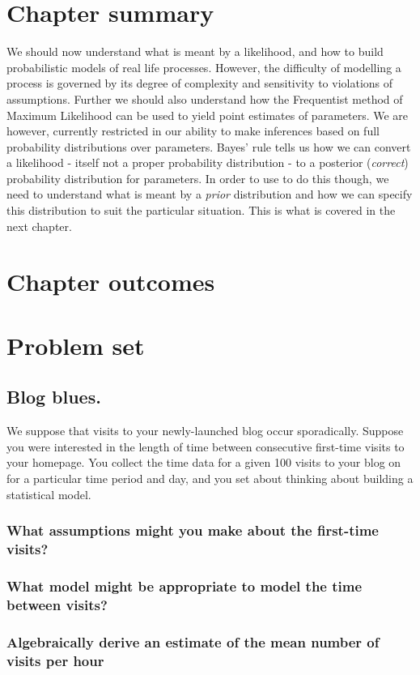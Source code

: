\documentclass[11pt,fullpage]{book}
\begin{document}
\section{Chapter summary}
We should now understand what is meant by a likelihood, and how to build probabilistic models of real life processes. However, the difficulty of modelling a process is governed by its degree of complexity and sensitivity to violations of assumptions. Further we should also understand how the Frequentist method of Maximum Likelihood can be used to yield point estimates of parameters. We are however, currently restricted in our ability to make inferences based on full probability distributions over parameters. Bayes' rule tells us how we can convert a likelihood - itself not a proper probability distribution - to a posterior (\textit{correct}) probability distribution for parameters. In order to use to do this though, we need to understand what is meant by a \textit{prior} distribution and how we can specify this distribution to suit the particular situation. This is what is covered in the next chapter.

\section{Chapter outcomes}

\section{Problem set}
\subsection{Blog blues.}
We suppose that visits to your newly-launched blog occur sporadically. Suppose you were interested in the length of time between consecutive first-time visits to your homepage. You collect the time data for a given 100 visits to your blog on for a particular time period and day, and you set about thinking about building a statistical model.
\subsubsection{What assumptions might you make about the first-time visits?}
\subsubsection{What model might be appropriate to model the time between visits?}
\subsubsection{Algebraically derive an estimate of the mean number of visits per hour}
\end{document}

